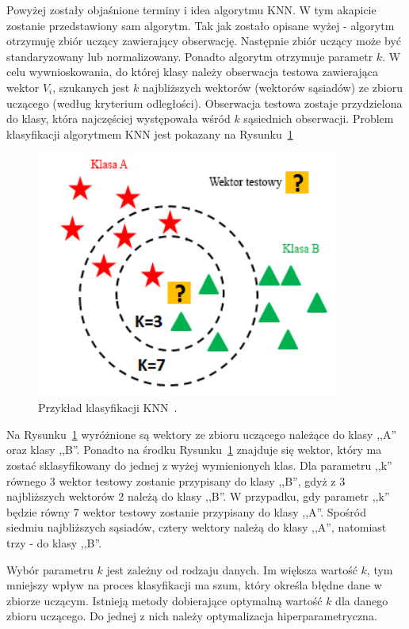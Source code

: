 \documentclass[a4paper,twoside,12pt]{book}
\begin{document}
    Powyżej zostały objaśnione terminy i idea algorytmu KNN. W tym akapicie zostanie przedstawiony sam algorytm.
    Tak jak zostało opisane wyżej - algorytm otrzymuję zbiór uczący zawierający obserwację. Następnie zbiór uczący
    może być standaryzowany lub normalizowany. Ponadto algorytm otrzymuje parametr $k$.
    W celu wywnioskowania, do której klasy należy obserwacja testowa zawierająca wektor $V_{i}$, szukanych jest $k$
    najbliższych wektorów (wektorów sąsiadów) ze zbioru uczącego (według kryterium odległości). Obserwacja testowa
    zostaje przydzielona do klasy, która najczęściej występowała wśród $k$ sąsiednich obserwacji.
    Problem klasyfikacji algorytmem KNN jest pokazany na Rysunku~\ref{fig.klasyfikacjaKNN}
    \begin{figure}
        \centering
        \includegraphics[width=10cm]{Obrazy/klasyfikacjaKNN.jpg}
        \caption{Przykład klasyfikacji KNN~\cite{KNNObraz}.}
        \label{fig.klasyfikacjaKNN}
    \end{figure}

    Na Rysunku~\ref{fig.klasyfikacjaKNN} wyróżnione są wektory ze zbioru uczącego należące do klasy ,,A'' oraz klasy
    ,,B''. Ponadto na środku Rysunku~\ref{fig.klasyfikacjaKNN} znajduje się wektor, który ma zostać
    sklasyfikowany do jednej z wyżej wymienionych klas.
    Dla parametru ,,k'' równego 3 wektor testowy zostanie przypisany do klasy ,,B'', gdyż z 3 najbliższych wektorów 2
    należą do klasy ,,B''. W przypadku, gdy parametr ,,k'' będzie równy 7 wektor testowy zostanie przypisany do klasy
    ,,A''. Spośród siedmiu najbliższych sąsiadów, cztery wektory należą do klasy ,,A'', natomiast trzy - do klasy ,,B''.

    Wybór parametru $k$ jest zależny od rodzaju danych. Im większa wartość $k$, tym mniejszy wpływ na proces
    klasyfikacji ma szum, który określa błędne dane w zbiorze uczącym. Istnieją metody dobierające optymalną wartość $k$ dla
    danego zbioru uczącego. Do jednej z nich należy optymalizacja hiperparametryczna.
\end{document}

